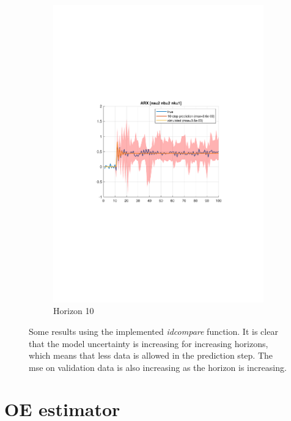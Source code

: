 \documentclass[]{article}
\begin{document}
\begin{figure}[ht]
\begin{subfigure}{.30\textwidth}
	\includegraphics[trim= 10cm 8cm 10cm 8cm, scale=0.3]{figures/1d-horizon_10.pdf}
	\caption{Horizon 10}
	\label{fig:1d-horizon10}
\end{subfigure}
\caption{Some results using the implemented \emph{idcompare} function. It is clear that the model uncertainty is increasing for increasing horizons, which means that less data is allowed in the prediction step. The mse on validation data is also increasing as the horizon is increasing.}
\label{fig:1d}
\end{figure}

\section{OE estimator}
\end{document}
